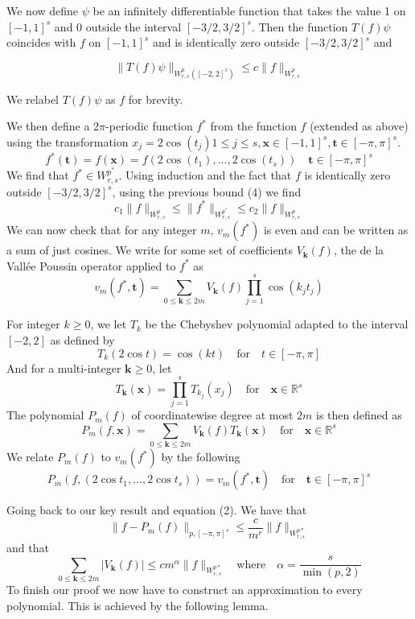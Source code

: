 \documentclass{article}
\begin{document}
We now define \(\psi \) be an infinitely differentiable function that takes the value 1 on \([-1,1]^s\) and \(0\)  outside the interval \([-3/2,3/2]^s\). Then the function \(T(f)\psi \) coincides with \(f\) on \([-1,1]^s\) and is identically zero outside \([-3/2,3/2]^s\) and

\setcounter{equation}{3} 
\begin{equation}
    \|T(f)\psi\|_{W_{r,s}^{p}([-2,2]^s)} \leq c \|f\|_{W_{r,s}^{p}}  
\end{equation}

We relabel \(T(f)\psi\) as \(f\) for brevity.

We then define a 2\(\pi\)-periodic function \(f^*\) from the function \(f\) (extended as above) using the transformation \(x_{j} = 2 \cos (t_{j}) 1 \leq j \leq s, \mathbf{x} \in [-1,1]^s, \mathbf{t} \in [-\pi ,\pi ]^s\).\\
\[
    f^*(\mathbf{t}) = f(\mathbf{x}) = f(2 \cos(t_1),...,2 \cos(t_s)) \quad \mathbf{t} \in [-\pi ,\pi ]^s
\]
We find that \(f^{\ast} \in W_{r,s}^{p^{\ast}}\). Using induction and the fact that \(f\) is identically zero outside \([-3/2,3/2]^s\), using the previous bound (4) we find
\[
    c_{1} \|f\|_{W_{r,s}^{p}} \leq \|f^{\ast}\|_{W_{r,s}^{p^{\ast}}} \leq c_{2} \|f\|_{W_{r,s}^{p}}
\]
We can now check that for any integer \(m\), \(v_{m}(f^{\ast} )\) is even and can be written as a sum of just cosines. We write for some set of coefficients \(V_{\mathbf{k} }(f)\), the de la Vallée Poussin operator applied to \(f^{\ast}\) as
\[
    v_{m}(f^{\ast}, \mathbf{t} ) = \sum_{0 \leq \mathbf{k} \leq 2m} V_{\mathbf{k}}(f) \prod_{j=1}^{s} \cos(k_{j}t_{j})
\]

For integer \(k \geq 0 \), we let \(T_{k}\) be the Chebyshev polynomial adapted to the interval \([-2,2]\) as defined by
\[
    T_{k}(2\cos t) = \cos(kt) \quad \text{for} \quad t \in [-\pi ,\pi ]
\]
And for a multi-integer \(\mathbf{k} \geq 0\), let 
\[
    T_{\mathbf{k}}(\mathbf{x}) = \prod_{j=1}^{s} T_{k_{j}}(x_{j}) \quad \text{for} \quad \mathbf{x} \in \mathbb{R}^{s}
\]
The polynomial \(P_{m}(f)\) of coordinatewise degree at most \(2m\) is then defined as
\[
    P_{m}(f, \mathbf{x}) = \sum_{0 \leq \mathbf{k} \leq 2m} V_{\mathbf{k}}(f) T_{\mathbf{k}}(\mathbf{x}) \quad \text{for} \quad \mathbf{x} \in \mathbb{R}^{s}  
\]
We relate \(P_{m}(f)\) to \(v_{m}(f^{\ast})\) by the following
\[
    P_{m}(f, (2\cos t_1, ..., 2\cos t_s)) = v_{m}(f^{\ast}, \mathbf{t}) \quad \text{for} \quad \mathbf{t} \in [-\pi ,\pi ]^s
\]

Going back to our key result and equation (2). We have that
\[
    \|f - P_{m}(f)\|_{p,[-\pi,\pi]^s} \leq \frac{c}{m^r} \|f\|_{W^{p*}_{r,s}}
\]
and that 
\[
    \sum_{0 \leq \mathbf{k} \leq 2m} |V_{\mathbf{k}}(f)| \leq cm^{\alpha} \|f\|_{W^{p*}_{r,s}}  \quad \text{where} \quad \alpha = \frac{s}{\min(p,2)}  
\]
To finish our proof we now have to construct an approximation to every polynomial. This is achieved by the following lemma.
\end{document}
